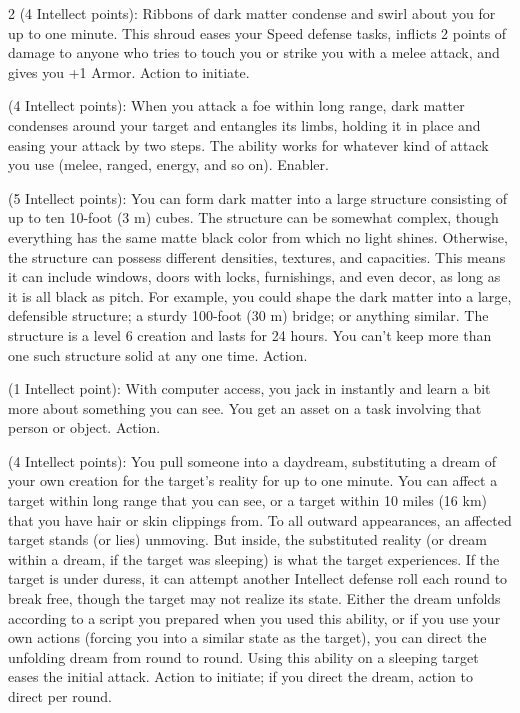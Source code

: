 \begin{multicols}{2}
 (4 Intellect points): Ribbons of dark matter condense and swirl about you for up to one minute. This shroud eases your Speed defense tasks, inflicts 2 points of damage to anyone who tries to touch you or strike you with a melee attack, and gives you +1 Armor. Action to initiate. 

 (4 Intellect points): When you attack a foe within long range, dark matter condenses around your target and entangles its limbs, holding it in place and easing your attack by two steps. The ability works for whatever kind of attack you use (melee, ranged, energy, and so on). Enabler. 

 (5 Intellect points): You can form dark matter into a large structure consisting of up to ten 10-foot (3 m) cubes. The structure can be somewhat complex, though everything has the same matte black color from which no light shines. Otherwise, the structure can possess different densities, textures, and capacities. This means it can include windows, doors with locks, furnishings, and even decor, as long as it is all black as pitch. For example, you could shape the dark matter into a large, defensible structure; a sturdy 100-foot (30 m) bridge; or anything similar. The structure is a level 6 creation and lasts for 24 hours. You can’t keep more than one such structure solid at any one time. Action. 

 (1 Intellect point): With computer access, you jack in instantly and learn a bit more about something you can see. You get an asset on a task involving that person or object. Action. 

 (4 Intellect points): You pull someone into a daydream, substituting a dream of your own creation for the target’s reality for up to one minute. You can affect a target within long range that you can see, or a target within 10 miles (16 km) that you have hair or skin clippings from. To all outward appearances, an affected target stands (or lies) unmoving. But inside, the substituted reality (or dream within a dream, if the target was sleeping) is what the target experiences. If the target is under duress, it can attempt another Intellect defense roll each round to break free, though the target may not realize its state. Either the dream unfolds according to a script you prepared when you used this ability, or if you use your own actions (forcing you into a similar state as the target), you can direct the unfolding dream from round to round. Using this ability on a sleeping target eases the initial attack. Action to initiate; if you direct the dream, action to direct per round. 


\end{multicols}
